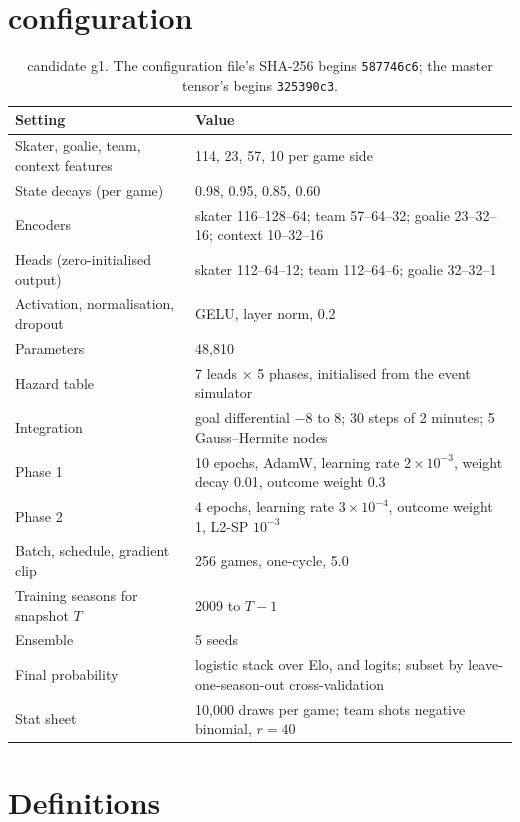\section{\neurhlG{} configuration}
\label{app:config}

\begin{table}[H]
\centering
\small
\caption{\neurhlG{} candidate g1. The configuration file's SHA-256 begins
\texttt{587746c6}; the master tensor's begins \texttt{325390c3}.}
\label{tab:config}
\begin{tabular}{lp{}}
\toprule
Setting & Value \\
\midrule
Skater, goalie, team, context features & 114, 23, 57, 10 per game side \\
State decays (per game) & 0.98, 0.95, 0.85, 0.60 \\
Encoders & skater 116--128--64; team 57--64--32; goalie 23--32--16; context 10--32--16 \\
Heads (zero-initialised output) & skater 112--64--12; team 112--64--6; goalie 32--32--1 \\
Activation, normalisation, dropout & GELU, layer norm, 0.2 \\
Parameters & 48,810 \\
Hazard table & 7 leads $\times$ 5 phases, initialised from the event simulator \\
Integration & goal differential $-8$ to 8; 30 steps of 2 minutes; 5 Gauss--Hermite nodes \\
Phase 1 & 10 epochs, AdamW, learning rate $2\times10^{-3}$, weight decay 0.01, outcome weight 0.3 \\
Phase 2 & 4 epochs, learning rate $3\times10^{-4}$, outcome weight 1, L2-SP $10^{-3}$ \\
Batch, schedule, gradient clip & 256 games, one-cycle, 5.0 \\
Training seasons for snapshot $T$ & 2009 to $T-1$ \\
Ensemble & 5 seeds \\
Final probability & logistic stack over Elo, \neurhlG{} and \neurhlH{} logits; subset by leave-one-season-out cross-validation \\
Stat sheet & 10,000 draws per game; team shots negative binomial, $r = 40$ \\
\bottomrule
\end{tabular}
\end{table}

\section{Definitions}
\label{app:defs}

